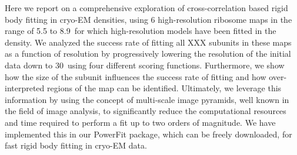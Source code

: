 Here we report on a comprehensive exploration of cross-correlation based rigid
body fitting in cryo-EM densities, using 6 high-resolution ribosome maps in the
range of 5.5 to 8.9\Angstrom\ for which high-resolution models have been fitted in the
density. We analyzed the success rate of fitting all XXX subunits in these maps
as a function of resolution by progressively lowering the resolution of the
initial data down to 30\Angstrom\ using four different scoring functions. Furthermore,
we show how the size of the subunit influences the success rate of fitting and
how over-interpreted regions of the map can be identified. Ultimately, we
leverage this information by using the concept of multi-scale image pyramids,
well known in the field of image analysis, to significantly reduce the
computational resources and time required to perform a fit up to two orders of
magnitude. We have implemented this in our PowerFit package, which can be
freely downloaded, for fast rigid body fitting in cryo-EM data.

